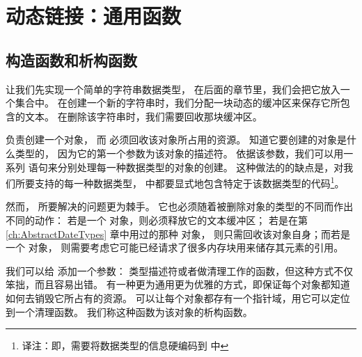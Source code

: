 

\chapter{动态链接：通用函数}
\label{ch:DynamicLinkage}

\section{构造函数和析构函数}
\label{sec:constrdestr}

让我们先实现一个简单的字符串数据类型，
在后面的章节里，我们会把它放入一个集合中。
在创建一个新的字符串时，我们分配一块动态的缓冲区来保存它所包含的文本。
在删除该字符串时，我们需要回收那块缓冲区。

 负责创建一个对象，
而  必须回收该对象所占用的资源。
 知道它要创建的对象是什么类型的，
因为它的第一个参数为该对象的描述符。
依据该参数，我们可以用一系列
 语句来分别处理每一种数据类型的对象的创建。
这种做法的的缺点是，对我们所要支持的每一种数据类型，
 中都要显式地包含特定于该数据类型的代码\footnote{
    译注：即，需要将数据类型的信息硬编码到  中}。

然而， 所要解决的问题更为棘手。
它也必须随着被删除对象的类型的不同而作出不同的动作：
若是一个  对象，则必须释放它的文本缓冲区；
若是在第 \ref{ch:AbstractDateTypes} 章中用过的那种  对象，
则只需回收该对象自身；而若是一个  对象，
则需要考虑它可能已经请求了很多内存块用来储存其元素的引用。

我们可以给  添加一个参数：
类型描述符或者做清理工作的函数，但这种方式不仅笨拙，而且容易出错。
有一种更为通用更为优雅的方式，即保证每个对象都知道如何去销毁它所占有的资源。
可以让每个对象都存有一个指针域，用它可以定位到一个清理函数。
我们称这种函数为该对象的析构函数。

